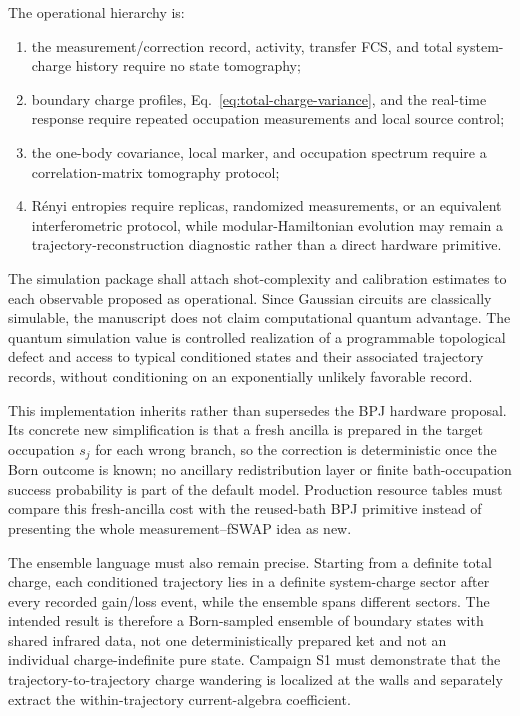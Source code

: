 \documentclass[aps,prx,twocolumn,floatfix,nofootinbib,superscriptaddress,longbibliography]{revtex4-2}
\begin{document}
The operational hierarchy is:
\begin{enumerate}
\item the measurement/correction record, activity, transfer FCS, and total system-charge
      history require no state tomography;
\item boundary charge profiles, Eq.~\eqref{eq:total-charge-variance}, and the real-time
      response require repeated occupation measurements and local source control;
\item the one-body covariance, local marker, and occupation spectrum require a
      correlation-matrix tomography protocol;
\item R\'enyi entropies require replicas, randomized measurements, or an equivalent
      interferometric protocol, while modular-Hamiltonian evolution may remain a
      trajectory-reconstruction diagnostic rather than a direct hardware primitive.
\end{enumerate}
The simulation package shall attach shot-complexity and calibration estimates to each
observable proposed as operational.  Since Gaussian circuits are classically
simulable, the manuscript does not claim computational quantum advantage.  The quantum
simulation value is controlled realization of a programmable topological defect and access
to typical conditioned states and their associated trajectory records, without conditioning on an
exponentially unlikely favorable record.

This implementation inherits rather than supersedes the BPJ hardware proposal.  Its concrete
new simplification is that a fresh ancilla is prepared in the target occupation $s_j$ for
each wrong branch, so the correction is deterministic once the Born outcome is known; no
ancillary redistribution layer or finite bath-occupation success probability is part of
the default model.  Production resource tables must compare this fresh-ancilla cost with
the reused-bath BPJ primitive instead of presenting the whole measurement--fSWAP idea as
new.

The ensemble language must also remain precise.  Starting from a definite total charge,
each conditioned trajectory lies in a definite system-charge sector after every recorded
gain/loss event, while the ensemble spans different sectors.  The intended result is
therefore a Born-sampled ensemble of boundary states with shared infrared data, not one
deterministically prepared ket and not an individual charge-indefinite pure state.  Campaign
S1 must demonstrate that the trajectory-to-trajectory charge wandering is localized at the
walls and separately extract the within-trajectory current-algebra coefficient.
\end{document}
